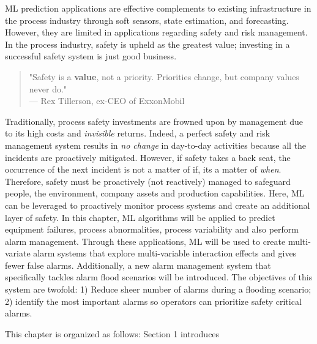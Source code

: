 %
% 

ML prediction applications are effective complements to existing infrastructure in the process industry through soft sensors, state estimation, and forecasting. However, they are limited in applications regarding safety and risk management.  In the process industry, safety is upheld as the greatest value; investing in a successful safety system is just good business.  

\begin{quote}
    "Safety is a \textbf{value}, not a priority.  Priorities change, but company values never do." \\
    --- Rex Tillerson, ex-CEO of ExxonMobil
\end{quote}

Traditionally, process safety investments are frowned upon by management due to its high costs and \textit{invisible} returns. Indeed, a perfect safety and risk management system results in \textit{no change} in day-to-day activities because all the incidents are proactively mitigated.  However, if safety takes a back seat, the occurrence of the next incident is not a matter of if, its a matter of \textit{when}. Therefore, safety must be proactively (not reactively) managed to safeguard people, the environment, company assets and production capabilities. Here, ML can be leveraged to proactively monitor process systems and create an additional layer of safety. In this chapter, ML algorithms will be applied to predict equipment failures, process abnormalities, process variability and also perform alarm management. Through these applications, ML will be used to create multi-variate alarm systems that explore multi-variable interaction effects and gives fewer false alarms. Additionally, a new alarm management system that specifically tackles alarm flood scenarios will be introduced.  The objectives of this system are twofold: 1) Reduce sheer number of alarms during a flooding scenario; 2) identify the most important alarms so operators can prioritize safety critical alarms.

This chapter is organized as follows: Section 1 introduces 






